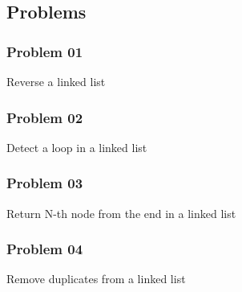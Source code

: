 \subsection{Problems}
\subsubsection{Problem 01}
\textsf{Reverse a linked list}


\subsubsection{Problem 02}
\textsf{Detect a loop in a linked list}


\subsubsection{Problem 03}
\textsf{Return N-th node from the end in a linked list}


\subsubsection{Problem 04}
\textsf{Remove duplicates from a linked list}

